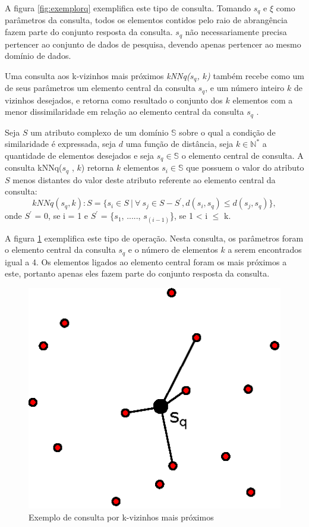 A figura \ref{fig:exemplorq} exemplifica este tipo de consulta. Tomando $s_q$ e $\xi$ como parâmetros da consulta, todos os
elementos contidos pelo raio de abrangência fazem parte do conjunto resposta da consulta. $s_q$ não necessariamente precisa
pertencer ao conjunto de dados de pesquisa, devendo apenas pertencer ao mesmo domínio de dados.


Uma consulta aos k-vizinhos mais próximos \textit{kNNq($s_q$, $k$)} também recebe como um de seus parâmetros um elemento central da consulta $s_q$, e um número inteiro $k$ de vizinhos desejados, e retorna
como resultado o conjunto dos $k$ elementos com a menor dissimilaridade em relação ao elemento central da consulta $s_q$ \cite{POLA2010}.

\begin{mydef}
  \label{def:def_knnq}
  Seja $S$ um atributo complexo de um domínio $\mathbb{S}$ sobre o qual a condição de similaridade é expressada, seja $d$ uma
  função de distância, seja $k \in \mathbb{N^*}$ a quantidade de elementos desejados e seja $s_q \in \mathbb{S}$ o elemento
  central de consulta. A consulta kNNq($s_q$ , $k$) retorna $k$ elementos $s_i \in \mathbb{S}$ que possuem o valor do atributo $S$ menos distantes do valor 
  deste atributo referente ao elemento central da consulta\cite{Ferreira2009}:
  \begin{equation} \label{eq:knnq}   
    kNNq(s_q, k): S = \{s_i \in S \ |\  \forall \ s_j \in S - S^{'}, d(s_i, s_q)\leq d(s_j, s_q)\},
  \end{equation}
  onde $S^{'}$ = 0, se i = 1 e $S^{'}$ = \{$s_1$, ....., $s_{(i-1)}$\}, se 1 < i $\leq$ k. 
\end{mydef}

A figura \ref{fig:exemploknnq} exemplifica este tipo de operação. Nesta consulta, os parâmetros foram o elemento central da consulta $s_q$ e o número de elementos $k$ a serem
encontrados igual a 4. Os elementos ligados ao elemento central foram os mais próximos a este, portanto apenas eles fazem parte do conjunto resposta da consulta.
\begin{figure}[H]
\centering
\includegraphics[width=.3\textwidth]{dados/figuras/knnq.eps}
\caption{Exemplo de consulta por k-vizinhos mais próximos}
\label{fig:exemploknnq}
\end{figure}

